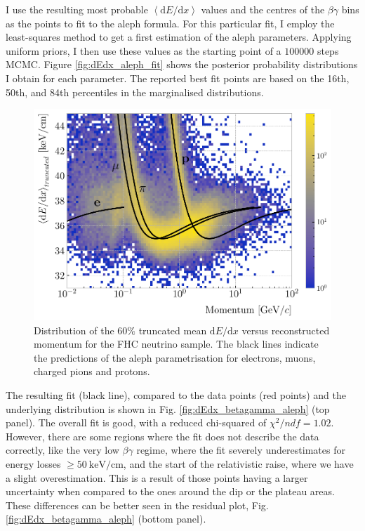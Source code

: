 I use the resulting most probable $\left<\mathrm{d}E/\mathrm{d}x\right>$ values and the centres of the $\beta\gamma$ bins as the points to fit to the \gls{aleph} formula. For this particular fit, I employ the least-squares method to get a first estimation of the \gls{aleph} parameters. Applying uniform priors, I then use these values as the starting point of a $100000$ steps MCMC. Figure \ref{fig:dEdx_aleph_fit} shows the posterior probability distributions I obtain for each parameter. The reported best fit points are based on the 16th, 50th, and 84th percentiles in the marginalised distributions.

\begin{figure}[t]
	\centering
	\includegraphics[width=.90\linewidth]{Images/GArSoft_PID/dEdx/dEdx_curves_with_fit.pdf}
	\caption[Distribution of the $60\%$ truncated mean $\mathrm{d}E/\mathrm{d}x$ versus reconstructed momentum for the FHC neutrino sample.]{Distribution of the $60\%$ truncated mean $\mathrm{d}E/\mathrm{d}x$ versus reconstructed momentum for the FHC neutrino sample. The black lines indicate the predictions of the \gls{aleph} parametrisation for electrons, muons, charged pions and protons.}
	\label{fig:dEdx_vs_momentum}
\end{figure}

The resulting fit (black line), compared to the data points (red points) and the underlying distribution is shown in Fig. \ref{fig:dEdx_betagamma_aleph} (top panel). The overall fit is good, with a reduced chi-squared of $\chi^{2}/ndf=1.02$. However, there are some regions where the fit does not describe the data correctly, like the very low $\beta\gamma$ regime, where the fit severely underestimates for energy losses $\geq 50 ~ \mathrm{keV}/\mathrm{cm}$, and the start of the relativistic raise, where we have a slight overestimation. This is a result of those points having a larger uncertainty when compared to the ones around the dip or the plateau areas. These differences can be better seen in the residual plot, Fig. \ref{fig:dEdx_betagamma_aleph} (bottom panel).

